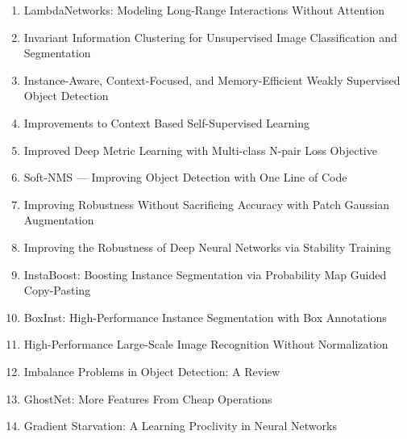 \documentclass[acmlarge]{acmart}
\begin{document}
\begin{enumerate}
	\item LambdaNetworks: Modeling Long-Range Interactions Without Attention \cite{Bello2021LambdaNetworksML} 

	\item Invariant Information Clustering for Unsupervised Image Classification and Segmentation \cite{Ji2019InvariantIC} 

	\item Instance-Aware, Context-Focused, and Memory-Efficient Weakly Supervised Object Detection \cite{Ren2020InstanceAwareCA} 

	\item Improvements to Context Based Self-Supervised Learning \cite{Mundhenk2018ImprovementsTC} 

	\item Improved Deep Metric Learning with Multi-class N-pair Loss Objective \cite{Sohn2016ImprovedDM} 

	\item Soft-NMS — Improving Object Detection with One Line of Code \cite{Bodla2017SoftNMSI} 

	\item Improving Robustness Without Sacrificing Accuracy with Patch Gaussian Augmentation \cite{Lopes2019ImprovingRW} 

	\item Improving the Robustness of Deep Neural Networks via Stability Training \cite{Zheng2016ImprovingTR} 

	\item InstaBoost: Boosting Instance Segmentation via Probability Map Guided Copy-Pasting \cite{Fang2019InstaBoostBI} 

	\item BoxInst: High-Performance Instance Segmentation with Box Annotations \cite{Tian2021BoxInstHI} 

	\item High-Performance Large-Scale Image Recognition Without Normalization \cite{Brock2021HighPerformanceLI} 

	\item Imbalance Problems in Object Detection: A Review \cite{Oksuz2021ImbalancePI} 

	\item GhostNet: More Features From Cheap Operations \cite{Han2020GhostNetMF} 

	\item Gradient Starvation: A Learning Proclivity in Neural Networks \cite{Pezeshki2020GradientSA} 


\end{enumerate}
\end{document}
